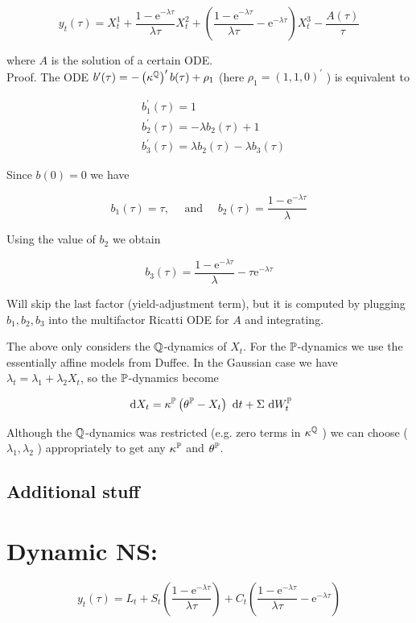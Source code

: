 $$
y_{t}(\tau)=X_{t}^{1}+\frac{1-\mathrm{e}^{-\lambda \tau}}{\lambda \tau} X_{t}^{2}+\left(\frac{1-\mathrm{e}^{-\lambda \tau}}{\lambda \tau}-\mathrm{e}^{-\lambda \tau}\right) X_{t}^{3}-\frac{A(\tau)}{\tau}
$$

where $A$ is the solution of a certain ODE.\\
Proof. The ODE $b^{\prime}(\tau)=-\left(\kappa^{\Q}\right)^{\prime} b(\tau)+\rho_{1}$ (here $\rho_{1}=(1,1,0)^{\prime}$ ) is equivalent to

$$
\begin{aligned}
& b_{1}^{\prime}(\tau)=1 \\
& b_{2}^{\prime}(\tau)=-\lambda b_{2}(\tau)+1 \\
& b_{3}^{\prime}(\tau)=\lambda b_{2}(\tau)-\lambda b_{3}(\tau)
\end{aligned}
$$

Since $b(0)=0$ we have

$$
b_{1}(\tau)=\tau, \quad \text { and } \quad b_{2}(\tau)=\frac{1-\mathrm{e}^{-\lambda \tau}}{\lambda}
$$

Using the value of $b_{2}$ we obtain

$$
b_{3}(\tau)=\frac{1-\mathrm{e}^{-\lambda \tau}}{\lambda}-\tau \mathrm{e}^{-\lambda \tau}
$$

Will skip the last factor (yield-adjustment term), but it is computed by plugging $b_{1}, b_{2}, b_{3}$ into the multifactor Ricatti ODE for $A$ and integrating.

The above only considers the $\Q$-dynamics of $X_{t}$. For the $\P$-dynamics we use the essentially affine models from Duffee. In the Gaussian case we have $\lambda_{t}=\lambda_{1}+\lambda_{2} X_{t}$, so the $\P$-dynamics become

$$
\d  X_{t}=\kappa^{\P}\left(\theta^{\P}-X_{t}\right) \d  t+\Sigma \d  W_{t}^{\P}
$$

Although the $\Q$-dynamics was restricted (e.g. zero terms in $\kappa^{\Q}$ ) we can choose ( $\lambda_{1}, \lambda_{2}$ ) appropriately to get any $\kappa^{\P}$ and $\theta^{\P}$.

\subsection{Additional stuff}
\section{Dynamic NS:}
$$
y_{t}(\tau)=L_{t}+S_{t}\left(\frac{1-\mathrm{e}^{-\lambda \tau}}{\lambda \tau}\right)+C_{t}\left(\frac{1-\mathrm{e}^{-\lambda \tau}}{\lambda \tau}-\mathrm{e}^{-\lambda \tau}\right)
$$

